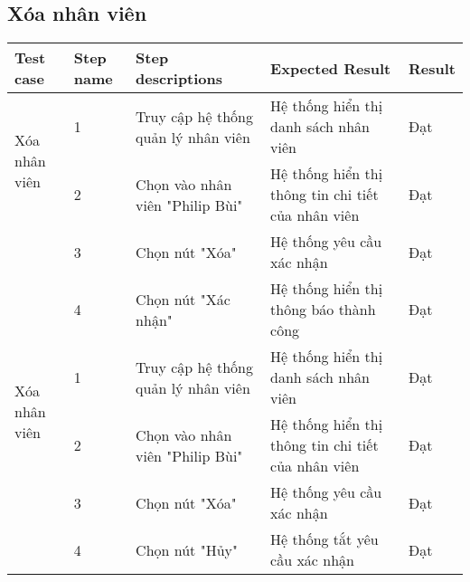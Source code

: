 \subsection{Xóa nhân viên}
{
    \setlength\extrarowheight{6pt}
    \begin{longtable}{| p{2.5cm}| p{1cm}| p{5.5cm}| p{4.5cm} | p{1.5cm} |}
        \hline
        \textbf{Test case} & \textbf{Step name} & \textbf{Step descriptions} & \textbf{Expected Result} & \textbf{Result} \\
        \hline
        \multirow[t]{2}{2.5cm}{Xóa nhân viên} & 1 & Truy cập hệ thống quản lý nhân viên & Hệ thống hiển thị danh sách nhân viên & Đạt \\
        \cline{2-5}
         & 2 & Chọn vào nhân viên "Philip Bùi" & Hệ thống hiển thị thông tin chi tiết của nhân viên & Đạt \\
        \cline{2-5}
        & 3 & Chọn nút "Xóa" & Hệ thống yêu cầu xác nhận & Đạt \\
        \cline{2-5}
         & 4 & Chọn nút "Xác nhận" & Hệ thống hiển thị thông báo thành công & Đạt \\
        \hline
        \multirow[t]{2}{2.5cm}{Xóa nhân viên} & 1 & Truy cập hệ thống quản lý nhân viên & Hệ thống hiển thị danh sách nhân viên & Đạt \\
        \cline{2-5}
         & 2 & Chọn vào nhân viên "Philip Bùi" & Hệ thống hiển thị thông tin chi tiết của nhân viên & Đạt \\
        \cline{2-5}
        & 3 & Chọn nút "Xóa" & Hệ thống yêu cầu xác nhận & Đạt \\
        \cline{2-5}
         & 4 & Chọn nút "Hủy" & Hệ thống tắt yêu cầu xác nhận & Đạt \\
        \hline
    \end{longtable} 
}

